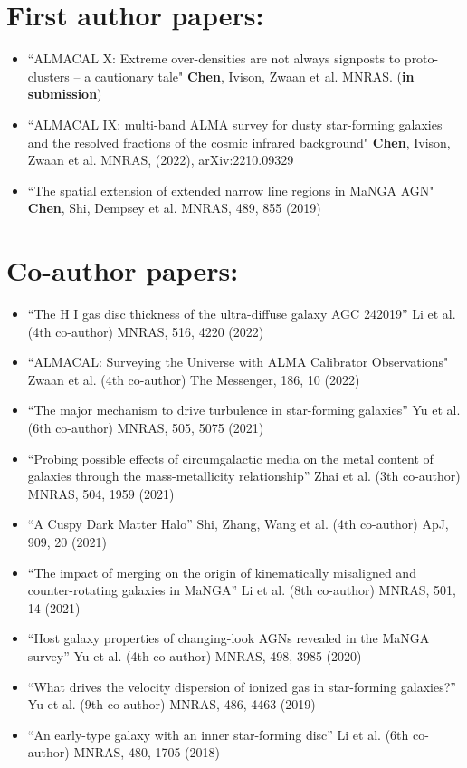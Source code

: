 \documentclass[A4,11pt]{article}
\newenvironment{paperlist}
{ \begin{itemize}[leftmargin=0.8cm, label={$\bullet$}]
    \setlength{\itemsep}{1pt}
    \setlength{\parskip}{1pt}
    \setlength{\parsep}{1pt}     }
{ \end{itemize}                  }
\begin{document}

\section{First author papers:}
\begin{paperlist}
    \item ``ALMACAL X: Extreme over-densities are not always signposts to proto-clusters -- a cautionary tale" {\bf Chen}, Ivison, Zwaan et al. MNRAS. ({\bf in submission})
    \item ``ALMACAL IX: multi-band ALMA survey for dusty star-forming galaxies and the resolved fractions of the cosmic infrared background" {\bf Chen}, Ivison, Zwaan et al. MNRAS, (2022), arXiv:2210.09329 
    \item ``The spatial extension of extended narrow line regions in MaNGA AGN" {\bf Chen}, Shi, Dempsey et al. MNRAS, 489, 855 (2019)
\end{paperlist}


\section{Co-author papers:}
\begin{paperlist}
    \item ``The H I gas disc thickness of the ultra-diffuse galaxy AGC 242019” Li et al. (4th co-author) MNRAS, 516, 4220 (2022)
    \item ``ALMACAL: Surveying the Universe with ALMA Calibrator Observations" Zwaan et al. (4th co-author) The Messenger, 186, 10 (2022)
    \item ``The major mechanism to drive turbulence in star-forming galaxies” Yu et al. (6th co-author) MNRAS, 505, 5075 (2021)
    \item ``Probing possible effects of circumgalactic media on the metal content of galaxies through the mass-metallicity relationship” Zhai et al. (3th co-author) MNRAS, 504, 1959 (2021)
    \item ``A Cuspy Dark Matter Halo” Shi, Zhang, Wang et al. (4th co-author) ApJ, 909, 20 (2021)
    \item ``The impact of merging on the origin of kinematically misaligned and counter-rotating galaxies in MaNGA” Li et al. (8th co-author) MNRAS, 501, 14 (2021)
    \item ``Host galaxy properties of changing-look AGNs revealed in the MaNGA survey” Yu et al. (4th co-author) MNRAS, 498, 3985 (2020)
    \item ``What drives the velocity dispersion of ionized gas in star-forming galaxies?” Yu et al. (9th co-author) MNRAS, 486, 4463 (2019)
    \item ``An early-type galaxy with an inner star-forming disc” Li et al. (6th co-author) MNRAS, 480, 1705 (2018)
\end{paperlist}
\end{document}
